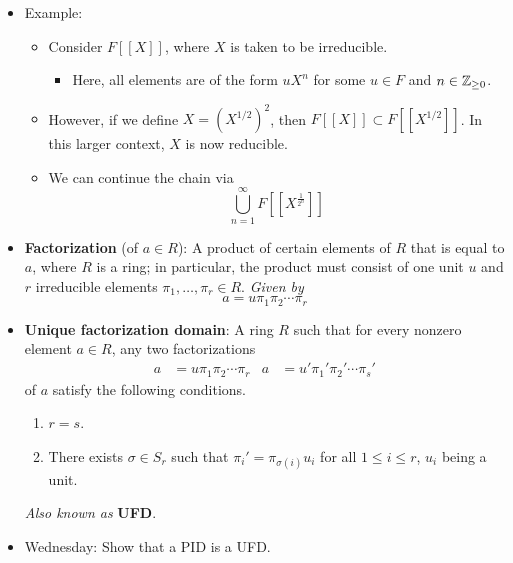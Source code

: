 \documentclass[../notes.tex]{subfiles}
\begin{document}
\begin{itemize}
    \item Example:
    \begin{itemize}
        \item Consider $F[[X]]$, where $X$ is taken to be irreducible.
        \begin{itemize}
            \item Here, all elements are of the form $uX^n$ for some $u\in F$ and $n\in{\mathbb{Z}_{\geq 0}}$.
        \end{itemize}
        \item However, if we define $X=(X^{1/2})^2$, then $F[[X]]\subset F[[X^{1/2}]]$. In this larger context, $X$ is now reducible.
        \item We can continue the chain via
        \begin{equation*}
            \bigcup_{n=1}^\infty F[[X^{\frac{1}{2^n}}]]
        \end{equation*}
    \end{itemize}
    \item \textbf{Factorization} (of $a\in R$): A product of certain elements of $R$ that is equal to $a$, where $R$ is a ring; in particular, the product must consist of one unit $u$ and $r$ irreducible elements $\pi_1,\dots,\pi_r\in R$. \emph{Given by}
    \begin{equation*}
        a = u\pi_1\pi_2\cdots\pi_r
    \end{equation*}
    \item \textbf{Unique factorization domain}: A ring $R$ such that for every nonzero element $a\in R$, any two factorizations
    \begin{align*}
        a &= u\pi_1\pi_2\cdots\pi_r&
        a &= u'\pi_1'\pi_2'\cdots\pi_s'
    \end{align*}
    of $a$ satisfy the following conditions.
    \begin{enumerate}[label={(\roman*)}]
        \item $r=s$.
        \item There exists $\sigma\in S_r$ such that $\pi_i'=\pi_{\sigma(i)}u_i$ for all $1\leq i\leq r$, $u_i$ being a unit.
    \end{enumerate}
    \emph{Also known as} \textbf{UFD}.
    \item Wednesday: Show that a PID is a UFD.
\end{itemize}
\end{document}
